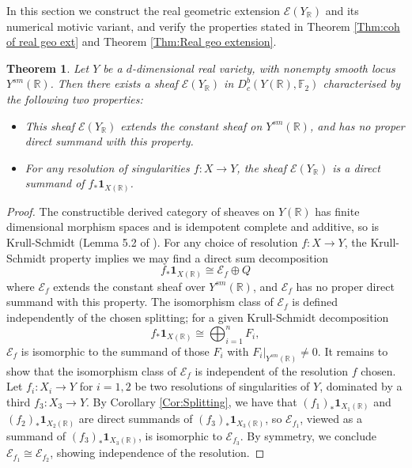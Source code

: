 \documentclass{amsart}
\newtheorem{thm}{Theorem}[section]
\theoremstyle{definition}
\theoremstyle{remark}
\begin{document}
In this section we construct the real geometric extension $\mathscr{E}(Y_\mathbb{R})$ and its numerical motivic variant, and verify the properties stated in Theorem \ref{Thm:coh of real geo ext} and Theorem \ref{Thm:Real geo extension}.

\begin{thm}\label{C2.Realgeoextensions}
Let $Y$ be a $d$-dimensional real variety, with nonempty smooth locus $Y^{sm}(\mathbb{R})$. Then there exists a sheaf $\mathscr{E}(Y_\mathbb{R})$ in $D^b_c(Y(\mathbb{R}),\mathbb{F}_2)$ characterised by the following two properties:
\begin{itemize}
    \item This sheaf $\mathscr{E}(Y_\mathbb{R})$ extends the constant sheaf on $Y^{sm}(\mathbb{R})$, and has no proper direct summand with this property.
    \item For any resolution of singularities $f:X\to Y$, the sheaf $\mathscr{E}(Y_\mathbb{R})$ is a direct summand of $f_*\mathbf{1}_{X(\mathbb{R})}$.
\end{itemize}

\end{thm}

\begin{proof}
The constructible derived category of sheaves on $Y(\mathbb{R})$ has finite dimensional morphism spaces and is idempotent complete and additive, so is Krull-Schmidt (Lemma 5.2 of \cite{KRAUSE2015535}).
For any choice of resolution $f:X\to Y$, the Krull-Schmidt property implies we may find a direct sum decomposition \[f_*\mathbf{1}_{X(\mathbb{R})}\cong \mathscr{E}_f\oplus Q\] where $\mathscr{E}_f$ extends the constant sheaf over $Y^{sm}(\mathbb{R})$, and $\mathscr{E}_f$ has no proper direct summand with this property. The isomorphism class of $\mathscr{E}_f$ is defined independently of the chosen splitting; for a given Krull-Schmidt decomposition \[f_*\mathbf{1}_{X(\mathbb{R})}\cong \bigoplus^n_{i=1} F_i,\] $\mathscr{E}_f$ is isomorphic to the summand of those $F_i$ with $F_i|_{Y^{sm}(\mathbb{R})}\neq 0$. It remains to show that the isomorphism class of $\mathscr{E}_f$ is independent of the resolution $f$ chosen. Let $f_i:X_i\to Y$ for $i=1,2$ be two resolutions of singularities of $Y$, dominated by a third $f_3:X_3\to Y$. By Corollary \ref{Cor:Splitting}, we have that $(f_1)_*\mathbf{1}_{X_1(\mathbb{R})}$ and $(f_2)_*\mathbf{1}_{X_2(\mathbb{R})}$ are direct summands of  $(f_3)_*\mathbf{1}_{X_3(\mathbb{R})}$, so $\mathscr{E}_{f_1}$, viewed as a summand of $(f_3)_*\mathbf{1}_{X_3(\mathbb{R})}$, is isomorphic to $\mathscr{E}_{f_3}$. By symmetry, we conclude $\mathscr{E}_{f_1}\cong \mathscr{E}_{f_2}$, showing independence of the resolution.
\end{proof}
\end{document}
